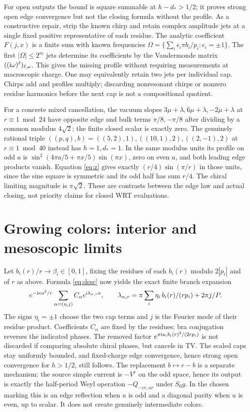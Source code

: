 \documentclass[11pt]{article}
\newcommand\ii{{\rm i}}
\begin{document}
For open outputs the bound is square summable at \(h-d_*>1/2\); it proves strong open edge convergence but not the closing formula without the profile. As a constructive repair, strip the known chirp and retain complex amplitude jets at a single fixed positive representative of each residue. The analytic coefficient \(F(j,x)\) is a finite sum with known frequencies \(\Omega=\{\sum_i\epsilon_i\pi b_i/p_i:\epsilon_i=\pm1\}\). The first \(|\Omega|\le2^m\) jets determine its coefficients by the Vandermonde matrix \(((\ii\omega)^\ell)_{\ell,\omega}\). This gives the missing profile without requiring measurements at macroscopic charge. One may equivalently retain two jets per individual cap. Chirps add and profiles multiply; discarding nonresonant chirps or nonzero residue harmonics before the next cap is not a compositional quotient.

For a concrete mixed cancellation, the vacuum slopes \(3\mu+\lambda,6\mu+\lambda,-2\mu+\lambda\) at \(r\equiv1\bmod24\) have opposite edge and bulk terms \(\pi/8,-\pi/8\) after dividing by a common modulus \(4\sqrt2\); the finite closed scalar is exactly zero. The genuinely rational triple \(((p,q),b)=((5,2),1),((10,1),2),((2,-1),2)\) at \(r\equiv1\bmod40\) instead has \(h=1,d_*=1\). In the same modulus units its profile on odd \(a\) is \(\sin^2(4\pi a/5+\pi x/5)\sin(\pi x)\), zero on even \(a\), and both leading edge products vanish. Equation \eqref{eq:z} gives exactly \((r/4)\sin(\pi/r)\) in those units, since the sine square is symmetric and its odd half has sum \(r/4\). The chiral limiting magnitude is \(\pi\sqrt2\). These are contrasts between the edge law and actual closing, not priority claims for closed WRT evaluations.

\section{Growing colors: interior and mesoscopic limits}

Let \(b_i(r)/r\to\beta_i\in[0,1]\), fixing the residues of each \(b_i(r)\) modulo \(2|p_i|\) and of \(r\) as above. Formula \eqref{eq:desc} now yields the exact finite branch expansion
\begin{equation}\label{eq:branches}
 e^{-\ii\kappa a^2/r}\sum_{\alpha=(\eta,j)}C_{\alpha}e^{\ii\lambda_{\alpha,r}a},
 \qquad \lambda_{\alpha,r}=\pi\sum_i \eta_i\,b_i(r)/(r p_i)+2\pi j/P .
\end{equation}
The signs \(\eta_i=\pm1\) choose the two cap terms and \(j\) is the Fourier mode of their residue product. Coefficients \(C_\alpha\) are fixed by the residues; bra conjugation reverses the indicated phases. The removed factor \(e^{\pi\ii u_i b_i(r)^2/(2rp_i)}\) is not discarded if comparing absolute chiral phases, but cancels in TV. The scaled caps stay uniformly bounded, and fixed-charge edge convergence, hence strong open convergence for \(h>1/2\), still follows. The replacement \(b\mapsto r-b\) is a separate mechanism: the source simple current is \(-V^r\) on the odd space, hence its output is exactly the half-period Weyl operation \(-Q_{-v r,u r}\) under \(S_0g\). In the chosen marking this is an edge reflection when \(u\) is odd and a diagonal parity when \(u\) is even, up to scalar. It does not create genuinely intermediate colors.
\end{document}
